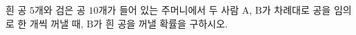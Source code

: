 흰 공 $5$개와 검은 공 $10$개가 들어 있는 주머니에서 두 사람 $\mathrm{A}$, $\mathrm{B}$가 차례대로 공을 임의로 한 개씩 꺼낼 때, $\mathrm{B}$가 흰 공을 꺼낼 확률을 구하시오. 
